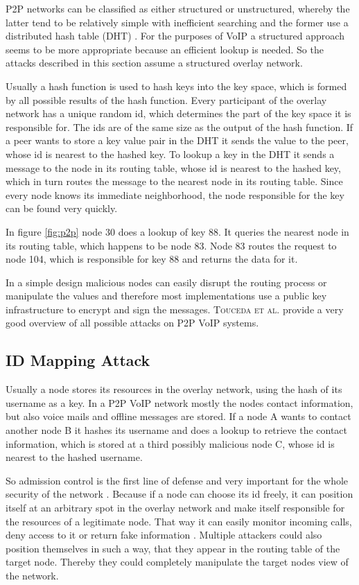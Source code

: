 \documentclass[a4paper,10pt]{article}
\begin{document}
P2P networks can be classified as either structured or unstructured, whereby the
latter tend to be relatively simple with inefficient searching and the former
use
a distributed hash table (DHT) \cite{chopra}. For the purposes of VoIP a
structured approach seems to be more appropriate because an
efficient lookup is needed. So the attacks described in this section assume a
structured overlay network.


Usually a hash function is used to hash keys into the key space, which is formed
by all possible results of the hash function. Every participant of the overlay
network has a unique random id, which determines the part of the key space it is
responsible for. The ids are of the same size
as the output of the hash function. If a peer wants to store a key value pair in
the DHT it sends the value to the peer, whose id is nearest to the hashed key.
To lookup a key in the DHT it sends a message to the
node in its routing table, whose id is nearest to the hashed key, which in turn
routes the message to the nearest node in its routing table.
Since every node knows its immediate neighborhood, the node responsible for the
key can be found very quickly.

In figure \ref{fig:p2p} node 30 does a lookup of key 88. It queries the nearest
node in its routing table, which happens to be node 83. Node 83 routes the
request to node 104, which is responsible for key 88 and returns the data for
it.

In a simple design malicious nodes can easily disrupt the routing process or
manipulate the values and therefore most implementations use a
public key infrastructure to encrypt and sign the messages. \textsc{Touceda et
al.} \cite{touceda} provide a very good overview of all possible attacks on P2P
VoIP systems.

\subsection{ID Mapping Attack}
\label{idmap}
Usually a node stores its resources in the overlay network, using the hash of
its username as a key. In a P2P VoIP network mostly the nodes contact
information, but
 also voice mails and offline messages are stored. If a node A wants to contact
another node B it hashes its username and does a lookup to retrieve the
contact information, which is stored at a third possibly malicious node C, whose
id is nearest to the hashed username.

So admission control is the first line of defense and very important for the
whole security of the network \cite{touceda, chopra}.
Because if a node can choose its id freely, it can position itself at an
arbitrary spot in the overlay network and make itself responsible for the
resources of a legitimate node. That way it can easily monitor incoming calls,
deny access to it or return fake information \cite{touceda}. Multiple attackers
could also position themselves in such a way, that they appear in the routing
table of the target node. Thereby they could completely manipulate the target
nodes view
of the network.
\end{document}
